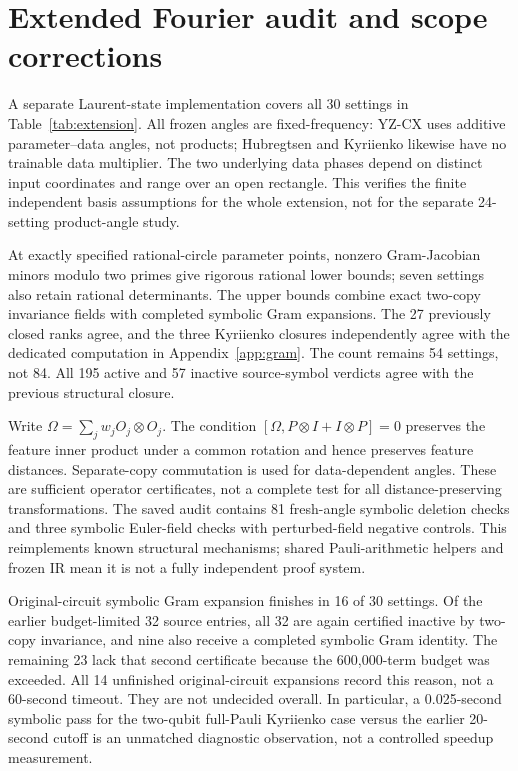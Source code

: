 \section{Extended Fourier audit and scope corrections}
\label{app:followup}
A separate Laurent-state implementation covers all 30 settings in
Table~\ref{tab:extension}. All frozen angles are fixed-frequency:
YZ-CX uses additive parameter--data angles, not products; Hubregtsen
and Kyriienko likewise have no trainable data multiplier. The two
underlying data phases depend on distinct input coordinates and
range over an open rectangle. This verifies the finite independent
basis assumptions for the whole extension, not for the separate
24-setting product-angle study.

At exactly specified rational-circle parameter points, nonzero
Gram-Jacobian minors modulo two primes give rigorous rational lower
bounds; seven settings also retain rational determinants. The upper
bounds combine exact two-copy invariance fields with completed
symbolic Gram expansions. The 27 previously closed ranks agree,
and the three Kyriienko closures independently agree with the
dedicated computation in Appendix~\ref{app:gram}. The count remains
54 settings, not 84. All 195 active and 57 inactive source-symbol
verdicts agree with the previous structural closure.

Write $\Omega=\sum_j w_j O_j\otimes O_j$. The condition
$[\Omega,P\otimes I+I\otimes P]=0$ preserves the feature inner
product under a common rotation and hence preserves feature
distances. Separate-copy commutation is used for data-dependent
angles. These are sufficient operator certificates, not a complete
test for all distance-preserving transformations. The saved audit
contains 81 fresh-angle symbolic deletion checks and three
symbolic Euler-field checks with perturbed-field negative controls.
This reimplements known structural mechanisms; shared Pauli-arithmetic
helpers and frozen IR mean it is not a fully independent proof system.

Original-circuit symbolic Gram expansion finishes in 16 of 30
settings. Of the earlier budget-limited 32 source entries, all 32
are again certified inactive by two-copy invariance, and nine also
receive a completed symbolic Gram identity. The remaining 23 lack
that second certificate because the 600,000-term budget was exceeded.
All 14 unfinished original-circuit expansions record this reason,
not a 60-second timeout. They are
not undecided overall. In particular, a 0.025-second symbolic pass
for the two-qubit full-Pauli Kyriienko case versus the earlier
20-second cutoff is an unmatched diagnostic observation, not a
controlled speedup measurement.

